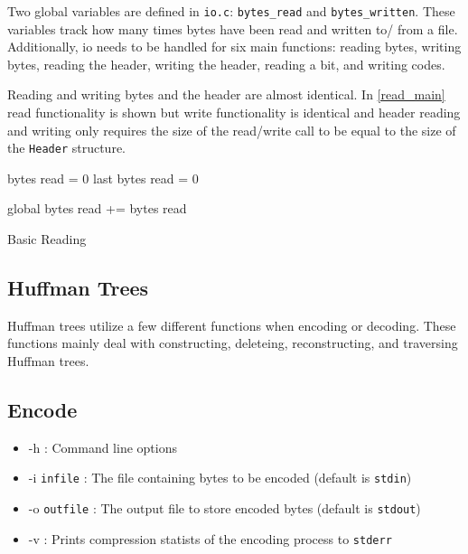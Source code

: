 \documentclass[12pt]{article}
\def\code#1{\texttt{#1}} %
\begin{document}
Two global variables are defined in \code{io.c}: \code{bytes\_read} and \code{bytes\_written}.
These variables track how many times bytes have been read and written to/ from a file.
Additionally, io needs to be handled for six main functions: reading bytes, writing bytes,
reading the header, writing the header, reading a bit, and writing codes.

Reading and writing bytes and the header are almost identical. In \vref{read_main} read
functionality is shown but write functionality is identical and header reading and writing
only requires the size of the read/write call to be equal to the size of the \code{Header}
structure.

\begin{algorithm}
	bytes read = 0\;
	last bytes read = 0\;


	global bytes read += bytes read\;
	\caption{Basic Reading}\label{read_main}
\end{algorithm}



\subsection{Huffman Trees}\label{huffman}

Huffman trees utilize a few different functions when encoding or decoding. These functions
mainly deal with constructing, deleteing, reconstructing, and traversing Huffman trees.

\subsection{Encode}

\begin{itemize}
	\item{-h : Command line options}
	\item{-i \code{infile} : The file containing bytes to be encoded (default is \code{stdin})}
	\item{-o \code{outfile} : The output file to store encoded bytes (default is \code{stdout})}
	\item{-v : Prints compression statists of the encoding process to \code{stderr}}
\end{itemize}
\end{document}

